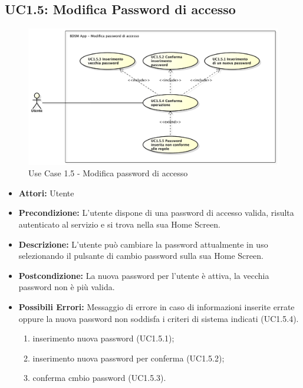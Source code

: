 \pagebreak


\subsection{UC1.5: Modifica Password di accesso}

\begin{figure}[!htbp]
    \centering
    \centerline{\includegraphics[scale=0.4]{./images/UC1_5.pdf}}
    \caption{Use Case 1.5 - Modifica password di accesso}
\end{figure}

\begin{itemize}
    \item \textbf{Attori:} Utente
    \item \textbf{Precondizione:} L'utente dispone di una password di accesso valida, risulta autenticato al servizio e si trova nella sua Home Screen.
    \item \textbf{Descrizione:} L'utente può cambiare la password attualmente in uso selezionando il pulsante di cambio password sulla sua Home Screen.
    \item \textbf{Postcondizione:} La nuova password per l'utente è attiva, la vecchia password non è più valida.
    \item \textbf{Possibili Errori:} Messaggio di errore in caso di informazioni inserite errate oppure la nuova password non soddisfa i criteri di sistema indicati (UC1.5.4).

    \begin{enumerate}
        \item inserimento nuova password (UC1.5.1);
        \item inserimento nuova password per conferma (UC1.5.2);
        \item conferma cmbio password (UC1.5.3).
    \end{enumerate}

\end{itemize}

